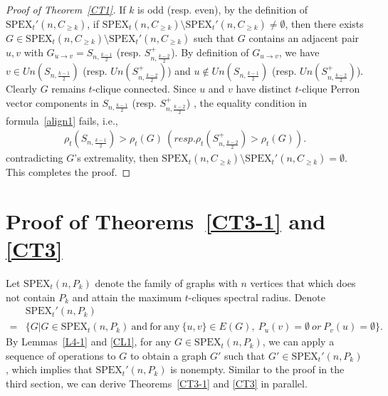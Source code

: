 \documentclass[preprint,12pt]{elsarticle}
\begin{document}
        \begin{proof}[Proof of Theorem~\ref{CT1}]

            If $k$ is odd (resp. even), by the definition of $\mathrm{SPEX}_t'(n,C_{\geq k})$, if $\mathrm{SPEX}_t(n,C_{\geq k})\setminus\mathrm{SPEX}_t'(n,C_{\geq k})\neq \emptyset$, then there exists $G \in \mathrm{SPEX}_t(n,C_{\geq k})\setminus\mathrm{SPEX}_t'(n,C_{\geq k})$ such that $G$ contains an adjacent pair $u,v$ with $G_{u \to v} = S_{n, \frac{k-1}{2} }$ (resp. $S_{n, \frac{k-2}{2} }^+$).
            By definition of $G_{u \to v}$, we have $v \in {Un}(S_{n, \frac{k-1}{2} })$ (resp. $Un(S_{n, \frac{k-2}{2} }^+)$) and $u \notin {Un}(S_{n, \frac{k-1}{2} })$ (resp. $Un(S_{n, \frac{k-2}{2} }^+)$).
            Clearly $G$ remains $t$-clique connected. Since $u$ and $v$ have distinct $t$-clique Perron vector components in $S_{n, \frac{k-1}{2} }$ (resp. $S_{n, \frac{k-2}{2} }^+$) , the equality condition in formula~\ref{align1} fails, i.e.,
                \begin{align*}
                    \rho_t(S_{n, \frac{k-1}{2} }) > \rho_t(G)\ (resp. \rho_t(S_{n, \frac{k-2}{2} }^+)> \rho_t(G)).
                \end{align*}
            contradicting $G$'s extremality, then $\mathrm{SPEX}_t(n,C_{\geq k})\setminus \mathrm{SPEX}_t'(n,C_{\geq k}) = \emptyset$. This completes the proof.
        \end{proof}

\section{Proof of Theorems~\ref{CT3-1} and \ref{CT3}}



        Let $\mathrm{SPEX}_t(n,P_{k})$ denote the family of graphs with $n$ vertices that which does not contain $P_k $ and attain the maximum $t$-cliques spectral radius. Denote
                \begin{align*}
                    &\mathrm{SPEX}_t'(n,P_{ k})\\=&\{G|G \in \mathrm{SPEX}_t(n,P_{ k})\mathrm{\ and\ for\ any\ }\{u,v\} \in E(G),\ P_u(v)=\emptyset\ or\ P_v(u)=\emptyset\}.
                \end{align*}
         By Lemmas~\ref{L4-1} and \ref{CL1}, for any $G \in \mathrm{SPEX}_t(n, P_k)$, we can apply a sequence of operations to $G$ to obtain a graph $G'$ such that $G' \in \mathrm{SPEX}_t'(n, P_k)$, which implies that $\mathrm{SPEX}_t'(n, P_k)$ is nonempty. Similar to the proof in the third section, we can derive Theorems~\ref{CT3-1} and \ref{CT3} in parallel.
\end{document}
